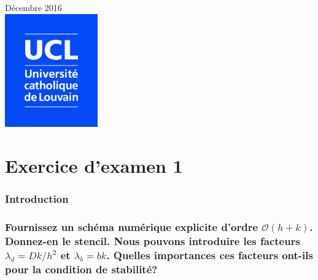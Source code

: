 \documentclass[a4paper, 12pt]{report}
\begin{document}
\begin{titlepage}


{\large Décembre 2016}\\[1.5cm] %


\includegraphics[width=4cm]{Logo_UCL_SCIENCES.jpg}\\[1cm] %


\vfill %

\end{titlepage}

\part{Exercice d'examen 1}

\section*{Introduction}


\section{Fournissez un schéma numérique explicite d'ordre $\mathcal{O}(h+k)$.
Donnez-en le stencil. Nous pouvons introduire les facteurs $\lambda_d = Dk/h^2$
et $\lambda_b = bk$. Quelles importances ces facteurs ont-ils pour la condition
de stabilité?}
\end{document}
